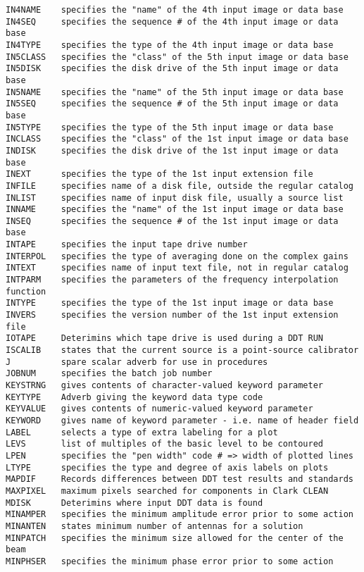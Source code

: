 \begin{verbatim}
IN4NAME    specifies the "name" of the 4th input image or data base
IN4SEQ     specifies the sequence # of the 4th input image or data base
IN4TYPE    specifies the type of the 4th input image or data base
IN5CLASS   specifies the "class" of the 5th input image or data base
IN5DISK    specifies the disk drive of the 5th input image or data base
IN5NAME    specifies the "name" of the 5th input image or data base
IN5SEQ     specifies the sequence # of the 5th input image or data base
IN5TYPE    specifies the type of the 5th input image or data base
INCLASS    specifies the "class" of the 1st input image or data base
INDISK     specifies the disk drive of the 1st input image or data base
INEXT      specifies the type of the 1st input extension file
INFILE     specifies name of a disk file, outside the regular catalog
INLIST     specifies name of input disk file, usually a source list
INNAME     specifies the "name" of the 1st input image or data base
INSEQ      specifies the sequence # of the 1st input image or data base
INTAPE     specifies the input tape drive number
INTERPOL   specifies the type of averaging done on the complex gains
INTEXT     specifies name of input text file, not in regular catalog
INTPARM    specifies the parameters of the frequency interpolation function
INTYPE     specifies the type of the 1st input image or data base
INVERS     specifies the version number of the 1st input extension file
IOTAPE     Deterimins which tape drive is used during a DDT RUN
ISCALIB    states that the current source is a point-source calibrator
J          spare scalar adverb for use in procedures
JOBNUM     specifies the batch job number
KEYSTRNG   gives contents of character-valued keyword parameter
KEYTYPE    Adverb giving the keyword data type code
KEYVALUE   gives contents of numeric-valued keyword parameter
KEYWORD    gives name of keyword parameter - i.e. name of header field
LABEL      selects a type of extra labeling for a plot
LEVS       list of multiples of the basic level to be contoured
LPEN       specifies the "pen width" code # => width of plotted lines
LTYPE      specifies the type and degree of axis labels on plots
MAPDIF     Records differences between DDT test results and standards
MAXPIXEL   maximum pixels searched for components in Clark CLEAN
MDISK      Deterimins where input DDT data is found
MINAMPER   specifies the minimum amplitude error prior to some action
MINANTEN   states minimum number of antennas for a solution
MINPATCH   specifies the minimum size allowed for the center of the beam
MINPHSER   specifies the minimum phase error prior to some action

\end{verbatim}
